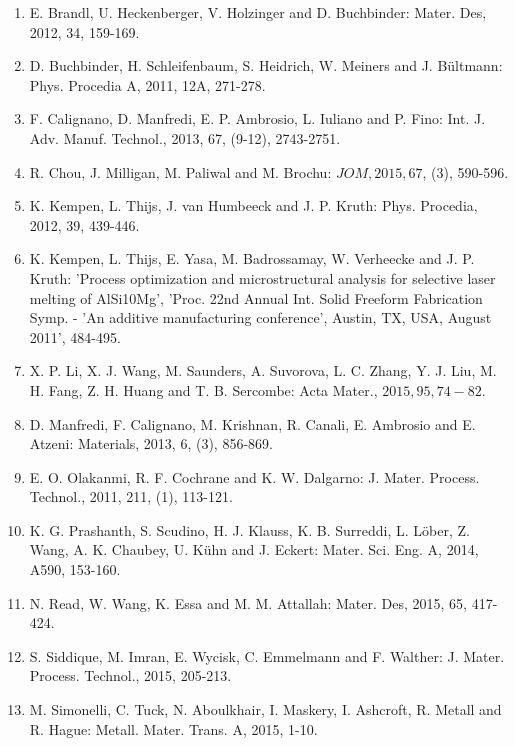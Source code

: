 \documentclass[10pt]{article}
\begin{document}
\begin{enumerate}
  \item E. Brandl, U. Heckenberger, V. Holzinger and D. Buchbinder: Mater. Des, 2012, 34, 159-169.

  \item D. Buchbinder, H. Schleifenbaum, S. Heidrich, W. Meiners and J. Bültmann: Phys. Procedia A, 2011, 12A, 271-278.

  \item F. Calignano, D. Manfredi, E. P. Ambrosio, L. Iuliano and P. Fino: Int. J. Adv. Manuf. Technol., 2013, 67, (9-12), 2743-2751.

  \item R. Chou, J. Milligan, M. Paliwal and M. Brochu: $J O M, 2015,67$, (3), 590-596.

  \item K. Kempen, L. Thijs, J. van Humbeeck and J. P. Kruth: Phys. Procedia, 2012, 39, 439-446.

  \item K. Kempen, L. Thijs, E. Yasa, M. Badrossamay, W. Verheecke and J. P. Kruth: 'Process optimization and microstructural analysis for selective laser melting of AlSi10Mg', 'Proc. 22nd Annual Int. Solid Freeform Fabrication Symp. - 'An additive manufacturing conference', Austin, TX, USA, August 2011', 484-495.

  \item X. P. Li, X. J. Wang, M. Saunders, A. Suvorova, L. C. Zhang, Y. J. Liu, M. H. Fang, Z. H. Huang and T. B. Sercombe: Acta Mater., $2015,95,74-82$.

  \item D. Manfredi, F. Calignano, M. Krishnan, R. Canali, E. Ambrosio and E. Atzeni: Materials, 2013, 6, (3), 856-869.

  \item E. O. Olakanmi, R. F. Cochrane and K. W. Dalgarno: J. Mater. Process. Technol., 2011, 211, (1), 113-121.

  \item K. G. Prashanth, S. Scudino, H. J. Klauss, K. B. Surreddi, L. Löber, Z. Wang, A. K. Chaubey, U. Kühn and J. Eckert: Mater. Sci. Eng. A, 2014, A590, 153-160.

  \item N. Read, W. Wang, K. Essa and M. M. Attallah: Mater. Des, 2015, 65, 417-424.

  \item S. Siddique, M. Imran, E. Wycisk, C. Emmelmann and F. Walther: J. Mater. Process. Technol., 2015, 205-213.

  \item M. Simonelli, C. Tuck, N. Aboulkhair, I. Maskery, I. Ashcroft, R. Metall and R. Hague: Metall. Mater. Trans. A, 2015, 1-10.


\end{enumerate}
\end{document}
